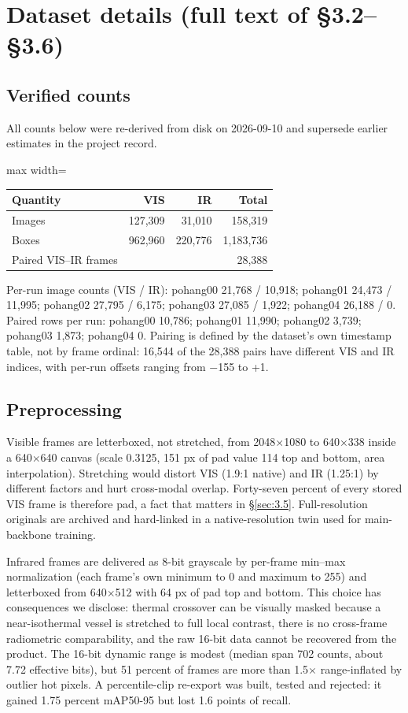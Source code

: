 \documentclass[10pt]{article}
\begin{document}
\section{Dataset details (full text of \S3.2--\S3.6)}\label{app:B}
\subsection{Verified counts}\label{app:B.1}
All counts below were re-derived from disk on 2026-09-10 and supersede earlier estimates in the project record.

\begin{center}
\small
\begin{adjustbox}{max width=\linewidth}
\begin{tabular}{lrrr}
\toprule
Quantity & VIS & IR & Total \\
\midrule
Images & 127,309 & 31,010 & 158,319 \\
Boxes & 962,960 & 220,776 & 1,183,736 \\
Paired VIS--IR frames &  &  & 28,388 \\
\bottomrule
\end{tabular}
\end{adjustbox}
\end{center}

Per-run image counts (VIS / IR): pohang00 21,768 / 10,918; pohang01 24,473 / 11,995; pohang02 27,795 / 6,175; pohang03 27,085 / 1,922; pohang04 26,188 / 0. Paired rows per run: pohang00 10,786; pohang01 11,990; pohang02 3,739; pohang03 1,873; pohang04 0. Pairing is defined by the dataset's own timestamp table, not by frame ordinal: 16,544 of the 28,388 pairs have different VIS and IR indices, with per-run offsets ranging from $-$155 to +1.

\subsection{Preprocessing}\label{app:B.2}
Visible frames are letterboxed, not stretched, from 2048$\times$1080 to 640$\times$338 inside a 640$\times$640 canvas (scale 0.3125, 151 px of pad value 114 top and bottom, area interpolation). Stretching would distort VIS (1.9:1 native) and IR (1.25:1) by different factors and hurt cross-modal overlap. Forty-seven percent of every stored VIS frame is therefore pad, a fact that matters in \S\ref{sec:3.5}. Full-resolution originals are archived and hard-linked in a native-resolution twin used for main-backbone training.

Infrared frames are delivered as 8-bit grayscale by per-frame min--max normalization (each frame's own minimum to 0 and maximum to 255) and letterboxed from 640$\times$512 with 64 px of pad top and bottom. This choice has consequences we disclose: thermal crossover can be visually masked because a near-isothermal vessel is stretched to full local contrast, there is no cross-frame radiometric comparability, and the raw 16-bit data cannot be recovered from the product. The 16-bit dynamic range is modest (median span 702 counts, about 7.72 effective bits), but 51 percent of frames are more than 1.5$\times$ range-inflated by outlier hot pixels. A percentile-clip re-export was built, tested and rejected: it gained 1.75 percent mAP50-95 but lost 1.6 points of recall.
\end{document}

